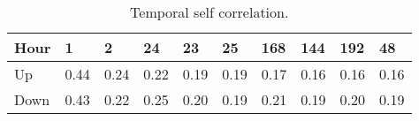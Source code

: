 \begin{table}[H] 
    \caption{Temporal self correlation.\label{temp_corr}}
    \begin{tabularx}{\textwidth}{CCCCCCCCCC}
    \toprule
        \textbf{Hour} & 1 & 2 & 24 & 23 & 25 & 168 & 144 & 192 & 48 \\
        \midrule
    Up		& 0.44 & 0.24 & 0.22 & 0.19 & 0.19 & 0.17 & 0.16 & 0.16 & 0.16 \\
    Down		& 0.43 & 0.22 & 0.25 & 0.20 & 0.19 & 0.21 & 0.19 & 0.20 & 0.19 \\
    \bottomrule
    \end{tabularx}
    \end{table}